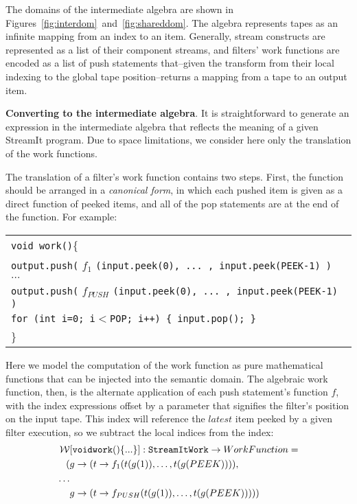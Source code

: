 The domains of the intermediate algebra are shown in
Figures~\ref{fig:interdom}~and~\ref{fig:shareddom}.  The algebra
represents tapes as an infinite mapping from an index to an item.
Generally, stream constructs are represented as a list of their
component streams, and filters' work functions are encoded as a list of
push statements that--given the transform from their local indexing to
the global tape position--returns a mapping from a tape to an output
item.

{\bf Converting to the intermediate algebra}.  It is straightforward
to generate an expression in the intermediate algebra that reflects
the meaning of a given StreamIt program.  Due to space limitations, we
consider here only the translation of the work functions.

The translation of a filter's work function contains two steps.
First, the function should be arranged in a {\it canonical form}, in
which each pushed item is given as a direct function of peeked items,
and all of the pop statements are at the end of the function.  For
example: \\
\vspace{0.2in}
\begin{scriptsize}
\begin{tabular}{l}
{\tt void work()}\{ \\
\hspace{12pt} {\tt output.push(} $f_1$ {\tt (input.peek(0), ... , input.peek(PEEK-1) )} \\
\hspace{12pt} $\dots$ \\
\hspace{12pt} {\tt output.push(} $f_{PUSH}$ {\tt (input.peek(0), ... , input.peek(PEEK-1) )} \\
\hspace{12pt} {\tt for (int i=0; i$<$POP; i++) \{ input.pop(); \}} \\
\}
\vspace{-12pt}
\end{tabular}
\end{scriptsize}
Here we model the computation of the work function as pure
mathematical functions that can be injected into the semantic domain.
The algebraic work function, then, is the alternate application of
each push statement's function $f$, with the index expressions offset
by a parameter that signifies the filter's position on the input tape.
This index will reference the $latest$ item peeked by a given filter
execution, so we subtract the local indices from the index:
\begin{align*}
{\cal W}&[{\tt void work() \{...\}}]: {\tt StreamIt Work} \ra
WorkFunction = \\
(&g \ra (t \ra f_1(t(g(1)), \dots , t(g(PEEK)))), \\
\dots \\
&g \ra (t \ra f_{PUSH}(t(g(1)), \dots , t(g(PEEK)))))
\end{align*}

